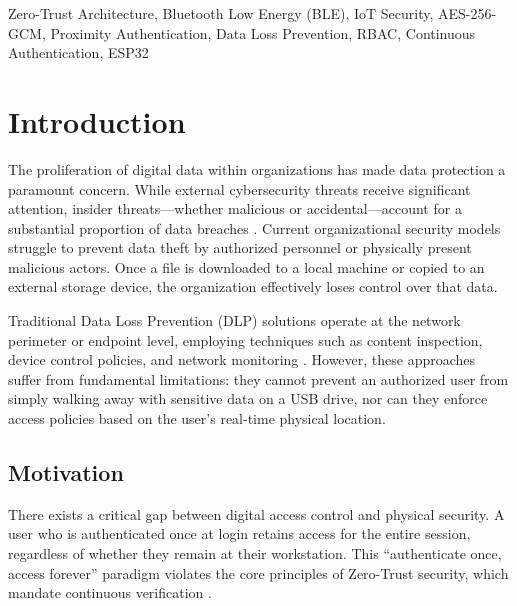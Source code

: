 \documentclass[conference]{IEEEtran}
\begin{document}
\begin{IEEEkeywords}
Zero-Trust Architecture, Bluetooth Low Energy (BLE), IoT Security, AES-256-GCM, Proximity Authentication, Data Loss Prevention, RBAC, Continuous Authentication, ESP32
\end{IEEEkeywords}

\section{Introduction}

The proliferation of digital data within organizations has made data protection a paramount concern. While external cybersecurity threats receive significant attention, insider threats—whether malicious or accidental—account for a substantial proportion of data breaches \cite{verizon2023}. Current organizational security models struggle to prevent data theft by authorized personnel or physically present malicious actors. Once a file is downloaded to a local machine or copied to an external storage device, the organization effectively loses control over that data.

Traditional Data Loss Prevention (DLP) solutions operate at the network perimeter or endpoint level, employing techniques such as content inspection, device control policies, and network monitoring \cite{dlp_survey}. However, these approaches suffer from fundamental limitations: they cannot prevent an authorized user from simply walking away with sensitive data on a USB drive, nor can they enforce access policies based on the user's real-time physical location.

\subsection{Motivation}
There exists a critical gap between digital access control and physical security. A user who is authenticated once at login retains access for the entire session, regardless of whether they remain at their workstation. This ``authenticate once, access forever'' paradigm violates the core principles of Zero-Trust security, which mandate continuous verification \cite{nist_zerotrust}.
\end{document}
